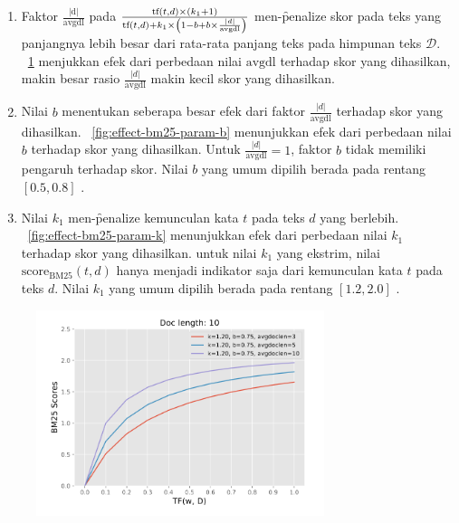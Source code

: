     \begin{enumerate}
        \item Faktor $\frac{|\text{d}|}{\text{avgdl}}$ pada $\frac{\text{tf}(t, d) \times (k_1 + 1)}{\text{tf}(t, d) + k_1 \times \left(1 - b + b \times \textcolor{black}{\frac{|d|}{\text{avgdl}}}\right)}$ men-\f{penalize} skor pada teks yang panjangnya lebih besar dari rata-rata panjang teks pada himpunan teks $\mathcal{D}$. \pic~\ref{fig:effect-bm25-long-doc} menjukkan efek dari perbedaan nilai $\text{avgdl}$ terhadap skor yang dihasilkan, makin besar rasio $\frac{|d|}{\text{avgdl}}$ makin kecil skor yang dihasilkan.
        \item Nilai $b$ menentukan seberapa besar efek dari faktor $\frac{|d|}{\text{avgdl}}$ terhadap skor yang dihasilkan. \pic~\ref{fig:effect-bm25-param-b} menunjukkan efek dari perbedaan nilai $b$ terhadap skor yang dihasilkan. Untuk $\frac{|d|}{\text{avgdl}}=1$, faktor $b$ tidak memiliki pengaruh terhadap skor. Nilai $b$ yang umum dipilih berada pada rentang $[0.5, 0.8]$ \citep{irlecture}.
        \item  Nilai $k_1$ men-\f{penalize} kemunculan kata $t$ pada teks $d$ yang berlebih. \pic~\ref{fig:effect-bm25-param-k} menunjukkan efek dari perbedaan nilai $k_1$ terhadap skor yang dihasilkan. untuk nilai $k_1$ yang ekstrim, nilai $\text{score}_{\text{BM25}}(t,d)$ hanya menjadi indikator saja dari kemunculan kata $t$ pada teks $d$. Nilai $k_1$ yang umum dipilih berada pada rentang $[1.2, 2.0]$ \citep{irlecture}.
    \end{enumerate}
    \begin{figure}[!ht]
        \centering
        \includegraphics[width=0.75\textwidth]{assets/pics/effect-bm25-long-doc.png}
        \label{fig:effect-bm25-long-doc}
    \end{figure}

